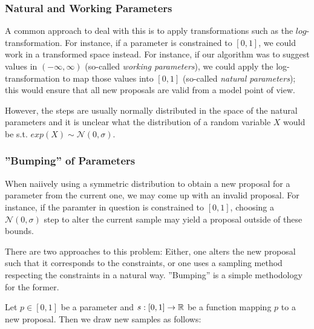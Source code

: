 \subsubsection*{Natural and Working Parameters}
A common approach to deal with this is to apply transformations such as the $log$-transformation. For instance, if a parameter is constrained to $[0,1]$, we could work in a transformed space instead. 
For instance, if our algorithm was to suggest values in $(-\infty, \infty)$ (so-called \textit{working parameters}), we could apply the log-transformation to map those values into $[0,1]$ (so-called \textit{natural parameters}); this would ensure that all new proposals are valid from a model point of view. 

However, the steps are usually normally distributed in the space of the natural parameters and it is unclear what the distribution of a random variable $X$ would be s.t. $exp(X) \sim \mathcal{N}(0, \sigma)$. 




\subsubsection*{''Bumping'' of Parameters}
When naiively using a symmetric distribution to obtain a new proposal for a parameter from the current one, we may come up with an invalid proposal. For instance, if the paramter in question is constrained to $[0,1]$, choosing a $\mathcal{N}(0, \sigma)$ step to alter the current sample may yield a proposal outside of these bounds.
 
There are two approaches to this problem: Either, one alters the new proposal such that it corresponds to the constraints, or one uses a sampling method respecting the constraints in a natural way. 
''Bumping'' is a simple methodology for the former. 

Let $p \in [0,1]$ be a parameter and $s: [0,1] \rightarrow \mathbb{R}$ be a function mapping $p$ to a new proposal. Then we draw new samples as follows:

